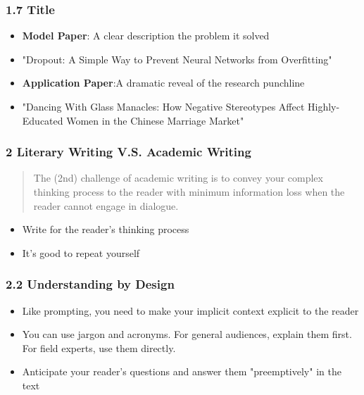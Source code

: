 \documentclass{beamer}
\begin{document}
    \begin{frame}
    \frametitle{1.7 Title}
    \begin{itemize}
        \item \textbf{Model Paper}: A clear description the problem it solved
        \item "Dropout: A Simple Way to Prevent Neural Networks from Overfitting"
        \item \textbf{Application Paper}:A dramatic reveal of the research punchline
        \item "Dancing With Glass Manacles: How Negative Stereotypes Affect Highly-Educated Women in the Chinese Marriage Market"
    \end{itemize}
    \end{frame}
    
    \begin{frame}
    \frametitle{2 Literary Writing V.S. Academic Writing}
    \begin{quote}
        The (2nd) challenge of academic writing is to convey your complex thinking process to the reader with minimum information loss when the reader cannot engage in dialogue.
    \end{quote}
    \begin{itemize}
        \item Write for the reader's thinking process
        \item It's good to repeat yourself
    \end{itemize}
    \end{frame}
    
    \begin{frame}
        \frametitle{2.2 Understanding by Design}
        \begin{itemize}
            \item Like prompting, you need to make your implicit context explicit to the reader
            \item You can use jargon and acronyms. For general audiences, explain them first. For field experts, use them directly.
            \item Anticipate your reader's questions and answer them "preemptively" in the text
        \end{itemize}
    \end{frame}
    
\end{document}
